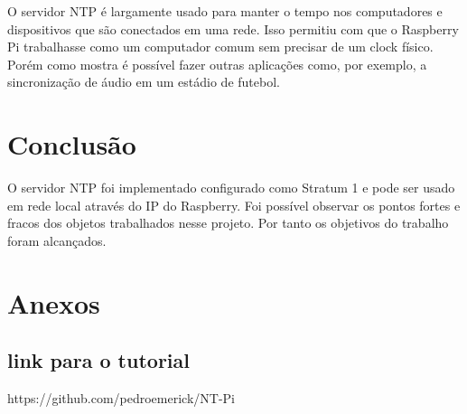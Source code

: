 \documentclass[12pt]{article}
\begin{document}
O servidor NTP é largamente usado para manter o tempo nos computadores e dispositivos que são conectados em uma rede. Isso permitiu com que o Raspberry Pi trabalhasse como um computador comum sem precisar de um clock físico. Porém como mostra \cite{corcoran} é possível fazer outras aplicações como, por exemplo, a sincronização de áudio em um estádio de futebol.


\section{Conclusão}\label{sec:figs}

O servidor NTP foi implementado configurado como Stratum 1 e pode ser usado em rede local através do IP do Raspberry. Foi possível observar os pontos fortes e fracos dos objetos trabalhados nesse projeto. Por tanto os objetivos do trabalho foram alcançados. 

\section{Anexos}
\subsection{link para o tutorial}
https://github.com/pedroemerick/NT-Pi


\end{document}
